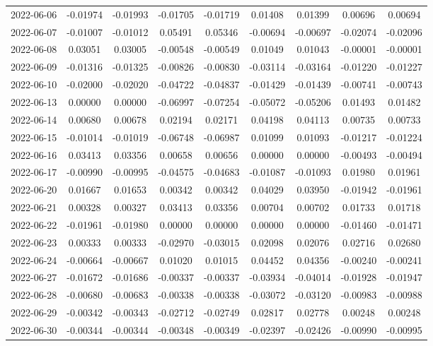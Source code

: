 {\begin{footnotesize}
\begin{longtable}{lcccccccc}
2022-06-06 & -0.01974 & -0.01993 & -0.01705 & -0.01719 & 0.01408 & 0.01399 & 0.00696 & 0.00694 \\
2022-06-07 & -0.01007 & -0.01012 & 0.05491 & 0.05346 & -0.00694 & -0.00697 & -0.02074 & -0.02096 \\
2022-06-08 & 0.03051 & 0.03005 & -0.00548 & -0.00549 & 0.01049 & 0.01043 & -0.00001 & -0.00001 \\
2022-06-09 & -0.01316 & -0.01325 & -0.00826 & -0.00830 & -0.03114 & -0.03164 & -0.01220 & -0.01227 \\
2022-06-10 & -0.02000 & -0.02020 & -0.04722 & -0.04837 & -0.01429 & -0.01439 & -0.00741 & -0.00743 \\
2022-06-13 & 0.00000 & 0.00000 & -0.06997 & -0.07254 & -0.05072 & -0.05206 & 0.01493 & 0.01482 \\
2022-06-14 & 0.00680 & 0.00678 & 0.02194 & 0.02171 & 0.04198 & 0.04113 & 0.00735 & 0.00733 \\
2022-06-15 & -0.01014 & -0.01019 & -0.06748 & -0.06987 & 0.01099 & 0.01093 & -0.01217 & -0.01224 \\
2022-06-16 & 0.03413 & 0.03356 & 0.00658 & 0.00656 & 0.00000 & 0.00000 & -0.00493 & -0.00494 \\
2022-06-17 & -0.00990 & -0.00995 & -0.04575 & -0.04683 & -0.01087 & -0.01093 & 0.01980 & 0.01961 \\
2022-06-20 & 0.01667 & 0.01653 & 0.00342 & 0.00342 & 0.04029 & 0.03950 & -0.01942 & -0.01961 \\
2022-06-21 & 0.00328 & 0.00327 & 0.03413 & 0.03356 & 0.00704 & 0.00702 & 0.01733 & 0.01718 \\
2022-06-22 & -0.01961 & -0.01980 & 0.00000 & 0.00000 & 0.00000 & 0.00000 & -0.01460 & -0.01471 \\
2022-06-23 & 0.00333 & 0.00333 & -0.02970 & -0.03015 & 0.02098 & 0.02076 & 0.02716 & 0.02680 \\
2022-06-24 & -0.00664 & -0.00667 & 0.01020 & 0.01015 & 0.04452 & 0.04356 & -0.00240 & -0.00241 \\
2022-06-27 & -0.01672 & -0.01686 & -0.00337 & -0.00337 & -0.03934 & -0.04014 & -0.01928 & -0.01947 \\
2022-06-28 & -0.00680 & -0.00683 & -0.00338 & -0.00338 & -0.03072 & -0.03120 & -0.00983 & -0.00988 \\
2022-06-29 & -0.00342 & -0.00343 & -0.02712 & -0.02749 & 0.02817 & 0.02778 & 0.00248 & 0.00248 \\
2022-06-30 & -0.00344 & -0.00344 & -0.00348 & -0.00349 & -0.02397 & -0.02426 & -0.00990 & -0.00995 \\

\end{longtable}
\end{footnotesize}}
